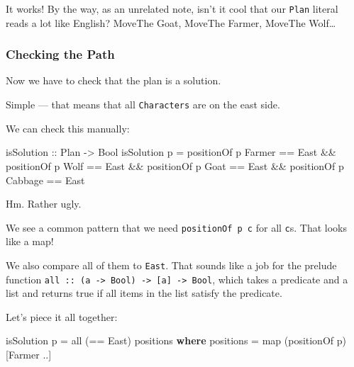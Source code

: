 \documentclass[]{article}
\newenvironment{Shaded}{}{}
\newcommand{\DataTypeTok}[1]{\textcolor[rgb]{0.56,0.13,0.00}{#1}}
\newcommand{\FunctionTok}[1]{\textcolor[rgb]{0.02,0.16,0.49}{#1}}
\newcommand{\KeywordTok}[1]{\textcolor[rgb]{0.00,0.44,0.13}{\textbf{#1}}}
\newcommand{\NormalTok}[1]{#1}
\newcommand{\OtherTok}[1]{\textcolor[rgb]{0.00,0.44,0.13}{#1}}
\begin{document}
It works! By the way, as an unrelated note, isn't it cool that our \texttt{Plan}
literal reads a lot like English? MoveThe Goat, MoveThe Farmer, MoveThe
Wolf\ldots{}

\hypertarget{checking-the-path}{%
\subsubsection{Checking the Path}\label{checking-the-path}}

Now we have to check that the plan is a solution.

Simple --- that means that all \texttt{Characters} are on the east side.

We can check this manually:

\begin{Shaded}
\begin{Highlighting}[]
\OtherTok{isSolution ::} \DataTypeTok{Plan} \OtherTok{->} \DataTypeTok{Bool}
\NormalTok{isSolution p }\FunctionTok{=}
\NormalTok{    positionOf p }\DataTypeTok{Farmer} \FunctionTok{==} \DataTypeTok{East}
    \FunctionTok{&&}\NormalTok{ positionOf p }\DataTypeTok{Wolf} \FunctionTok{==} \DataTypeTok{East}
    \FunctionTok{&&}\NormalTok{ positionOf p }\DataTypeTok{Goat} \FunctionTok{==} \DataTypeTok{East}
    \FunctionTok{&&}\NormalTok{ positionOf p }\DataTypeTok{Cabbage} \FunctionTok{==} \DataTypeTok{East}
\end{Highlighting}
\end{Shaded}

Hm. Rather ugly.

We see a common pattern that we need \texttt{positionOf\ p\ c} for all
\texttt{c}s. That looks like a map!

We also compare all of them to \texttt{East}. That sounds like a job for the
prelude function
\texttt{all\ ::\ (a\ -\textgreater{}\ Bool)\ -\textgreater{}\ {[}a{]}\ -\textgreater{}\ Bool},
which takes a predicate and a list and returns true if all items in the list
satisfy the predicate.

Let's piece it all together:

\begin{Shaded}
\begin{Highlighting}[]
\NormalTok{isSolution p }\FunctionTok{=}\NormalTok{ all (}\FunctionTok{==} \DataTypeTok{East}\NormalTok{) positions}
    \KeywordTok{where}
\NormalTok{        positions }\FunctionTok{=}\NormalTok{ map (positionOf p) [}\DataTypeTok{Farmer} \FunctionTok{..}\NormalTok{]}
\end{Highlighting}
\end{Shaded}
\end{document}
